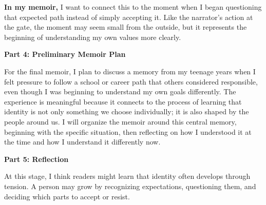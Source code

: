 \documentclass[12pt]{article}
\begin{document}
\noindent\textbf{In my memoir,} I want to connect this to the moment when I began questioning that expected path instead of simply accepting it. Like the narrator's action at the gate, the moment may seem small from the outside, but it represents the beginning of understanding my own values more clearly.

\noindent\textbf{Part 4: Preliminary Memoir Plan}

For the final memoir, I plan to discuss a memory from my teenage years when I felt pressure to follow a school or career path that others considered responsible, even though I was beginning to understand my own goals differently. The experience is meaningful because it connects to the process of learning that identity is not only something we choose individually; it is also shaped by the people around us. I will organize the memoir around this central memory, beginning with the specific situation, then reflecting on how I understood it at the time and how I understand it differently now.

\noindent\textbf{Part 5: Reflection}

At this stage, I think readers might learn that identity often develops through tension. A person may grow by recognizing expectations, questioning them, and deciding which parts to accept or resist.
\end{document}
